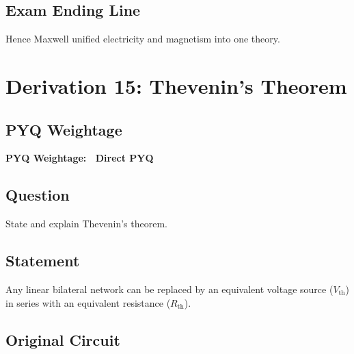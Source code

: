 \documentclass[11pt,a4paper]{article}
\begin{document}
\subsection*{Exam Ending Line}
Hence Maxwell unified electricity and magnetism into one theory.

\newpage

\section{Derivation 15: Thevenin's Theorem}

\subsection*{PYQ Weightage}
\begin{tcolorbox}[colback=yellow!10!white, colframe=orange, halign=center]
    \textbf{PYQ Weightage: \textasteriskcentered\textasteriskcentered\textasteriskcentered\textasteriskcentered\textasteriskcentered\ Direct PYQ}
\end{tcolorbox}

\subsection*{Question}
State and explain Thevenin's theorem.

\subsection*{Statement}
Any linear bilateral network can be replaced by an equivalent voltage source (\( V_{\text{th}} \)) in series with an equivalent resistance (\( R_{\text{th}} \)).

\subsection*{Original Circuit}
\begin{center}
\end{center}
\end{document}
